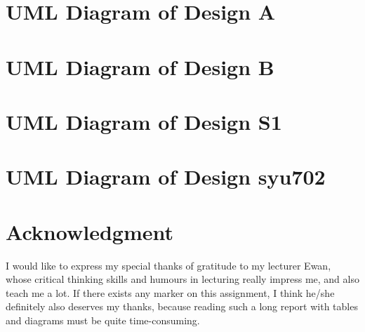 \documentclass[conference]{IEEEtran}
\begin{document}
	
	
	
	\appendices 
	\clearpage
	\section{UML Diagram of Design A}
	\clearpage
	\section{UML Diagram of Design B}
	\clearpage
	\section{UML Diagram of Design S1}
	\clearpage
	\section{UML Diagram of Design syu702}
	\clearpage

	\section*{Acknowledgment}
	
	
	I would like to express my special thanks of gratitude to my lecturer Ewan, whose critical thinking skills and humours in lecturing really impress me, and also teach me a lot. If there exists any marker on this assignment, I think he/she definitely also deserves my thanks, because reading such a long report with tables and diagrams must be quite time-consuming.
	
	
	\printglossaries
	
	
	
	
	
	
	
	
	
	
\end{document}
